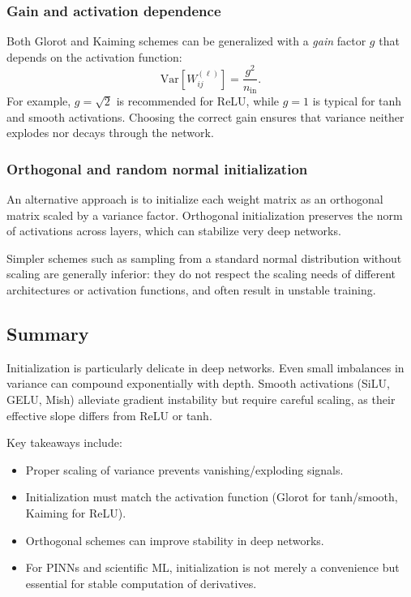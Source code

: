 \subsubsection{Gain and activation dependence}
Both Glorot and Kaiming schemes can be generalized with a \emph{gain} factor 
$g$ that depends on the activation function:
\[
  \mathrm{Var}[W_{ij}^{(\ell)}] = \frac{g^2}{n_\text{in}}.
\]
For example, $g=\sqrt{2}$ is recommended for ReLU, while $g=1$ is typical for 
tanh and smooth activations. Choosing the correct gain ensures that variance 
neither explodes nor decays through the network.  

\subsubsection{Orthogonal and random normal initialization}
An alternative approach is to initialize each weight matrix as an orthogonal 
matrix scaled by a variance factor. Orthogonal initialization preserves the 
norm of activations across layers, which can stabilize very deep networks.  

Simpler schemes such as sampling from a standard normal distribution without 
scaling are generally inferior: they do not respect the scaling needs of 
different architectures or activation functions, and often result in 
unstable training.  



\subsection{Summary}
Initialization is particularly delicate in deep networks. Even small 
imbalances in variance can compound exponentially with depth. Smooth 
activations (SiLU, GELU, Mish) alleviate gradient instability but 
require careful scaling, as their effective slope differs from ReLU or tanh.  

Key takeaways include:
\begin{itemize}
  \item Proper scaling of variance prevents vanishing/exploding signals.  
  \item Initialization must match the activation function (Glorot for tanh/smooth, 
  Kaiming for ReLU).  
  \item Orthogonal schemes can improve stability in deep networks.  
  \item For PINNs and scientific ML, initialization is not merely a convenience 
  but essential for stable computation of derivatives.  
\end{itemize}

